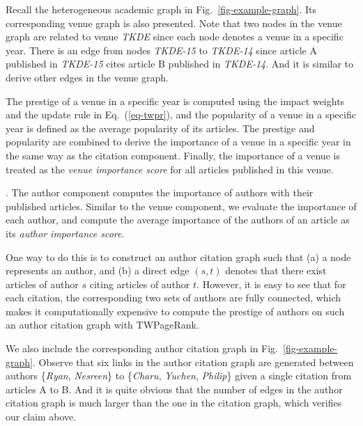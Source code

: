 \begin{example} \label{eg-model-venue}
Recall the heterogeneous academic graph in Fig.~\ref{fig-example-graph}. Its corresponding venue graph is also presented. Note that two nodes in the venue graph are related to venue {\em TKDE} since each node denotes a venue in a specific year. There is an edge from nodes {\em TKDE-15} to {\em TKDE-14} since article A published in {\em TKDE-15} cites article B published in {\em TKDE-14}. And it is similar to derive other edges in the venue graph.
\end{example}

The prestige of a venue in a specific year is computed using the impact weights and the update rule in Eq.~(\ref{eq-twpr}), and the popularity of a venue in a specific year is defined as the average popularity of its articles. The prestige and popularity are combined to derive the importance of a venue in a specific year in the same way as the citation component. Finally, the importance of a venue is treated as the {\em venue importance score} for all articles published in this venue.






.
The author component computes the importance of authors with their published articles.
%
Similar to the venue component, we evaluate the importance of each author, and compute the average importance of the authors of an article as its {\em author importance score}.

One way to do this is to construct an author citation graph  such that (a) a node represents an author, and (b) a direct edge $(s,t)$ denotes that there exist articles of author $s$ citing articles of author $t$. However, it is easy to see that for each citation, the corresponding two sets of authors are fully connected, which makes it computationally expensive to compute the prestige of authors on such an author citation graph with TWPageRank.

\begin{example} \label{eg-model-author}
We also include the corresponding author citation graph in Fig.~\ref{fig-example-graph}. Observe that six links in the author citation graph are generated between authors \{{\em Ryan}, {\em Nesreen}\} to \{{\em Charu}, {\em Yuchen}, {\em Philip}\} given a single citation from articles A to B. And it is quite obvious that the number of edges in the author citation graph is much larger than the one in the citation graph, which verifies our claim above.
\end{example}


